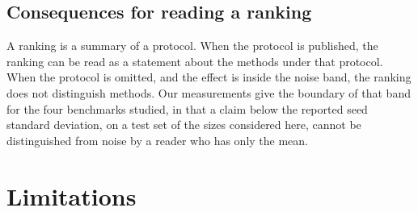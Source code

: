 \documentclass[journal,twoside,10pt]{IEEEtran}
\begin{document}
\subsection{Consequences for reading a ranking}


A ranking is a summary of a protocol. When the protocol is published, the ranking can be read as a statement about the methods under that protocol. When the protocol is omitted, and the effect is inside the noise band, the ranking does not distinguish methods. Our measurements give the boundary of that band for the four benchmarks studied, in that a claim below the reported seed standard deviation, on a test set of the sizes considered here, cannot be distinguished from noise by a reader who has only the mean.

\section{Limitations}
\end{document}
